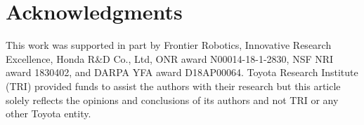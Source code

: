\section*{Acknowledgments}
This work was supported in part by Frontier Robotics, Innovative Research Excellence, Honda R\&D Co., Ltd, ONR award N00014-18-1-2830, NSF NRI award 1830402, and DARPA YFA award D18AP00064. Toyota Research Institute (TRI) provided funds to assist the authors with their research but this article solely reflects the opinions and conclusions of its authors and not TRI or any other Toyota entity. 